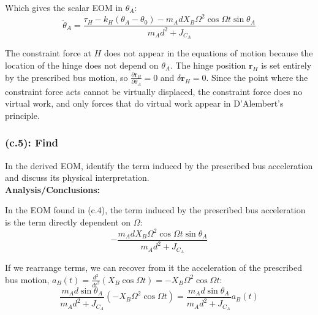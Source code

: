 \documentclass[titlepage]{article}
\begin{document}
\begin{mdframed}[linewidth=1pt, innertopmargin=10pt, innerbottommargin=10pt]
	Which gives the scalar EOM in $\theta_A$:
	\begin{equation}
		\ddot{\theta}_A=\frac{\tau_H-k_H(\theta_A-\theta_0)-m_AdX_B\Omega^2\cos\Omega t\sin\theta_A}{m_Ad^2+J_{C_A}}
		\label{eq:c4eom}
	\end{equation}
\end{mdframed}

\begin{mdframed}[linewidth=1pt, innertopmargin=10pt, innerbottommargin=10pt]
	The constraint force at $H$ does not appear in the equations of motion because the location of the hinge does not depend on $\theta_A$. The hinge position $\boldsymbol{r}_H$ is set entirely by the prescribed bus motion, so $\frac{\partial\boldsymbol{r}_H}{\partial\theta_A}=0$ and $\delta\boldsymbol{r}_H=0$. Since the point where the constraint force acts cannot be virtually displaced, the constraint force does no virtual work, and only forces that do virtual work appear in D'Alembert's principle.
\end{mdframed}

\subsubsection*{(c.5): Find}
In the derived EOM, identify the term induced by the prescribed bus acceleration and discuss its physical interpretation.\\

\textbf{Analysis/Conclusions:}\\
\begin{mdframed}[linewidth=1pt, innertopmargin=10pt, innerbottommargin=10pt]
	In the EOM found in (c.4), the term induced by the prescribed bus acceleration is the term directly dependent on $\Omega$:
	\begin{equation}
		-\frac{m_AdX_B\Omega^2\cos\Omega t\sin\theta_A}{m_Ad^2+J_{C_A}}
	\end{equation}
\end{mdframed}

If we rearrange terms, we can recover from it the acceleration of the prescribed bus motion, $a_B(t)=\frac{d^2}{dt^2}\left(X_B\cos\Omega t\right)=-X_B\Omega^2\cos\Omega t$:
\begin{equation}
	\frac{m_Ad\sin\theta_A}{m_Ad^2+J_{C_A}}\left(-X_B\Omega^2\cos\Omega t\right)=\frac{m_Ad\sin\theta_A}{m_Ad^2+J_{C_A}}a_B(t)
\end{equation}
\end{document}
